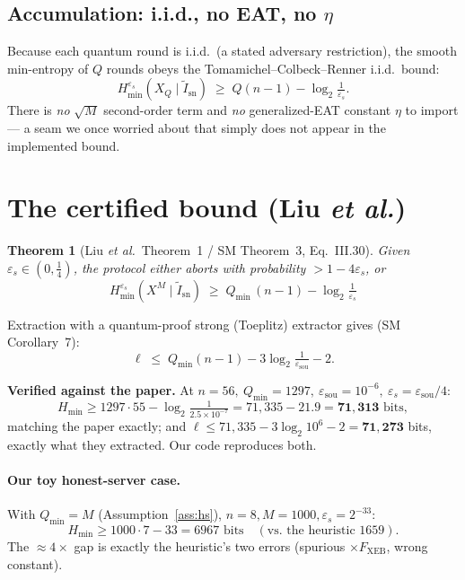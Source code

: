\documentclass[11pt]{article}
\theoremstyle{definition}
\theoremstyle{plain}
\newtheorem{theorem}{Theorem}
\newcommand{\Fxeb}{F_{\mathrm{XEB}}}
\newcommand{\Hmin}{H_{\min}}
\newcommand{\epss}{\varepsilon_{s}}
\newcommand{\epssou}{\varepsilon_{\mathrm{sou}}}
\newcommand{\Qmin}{Q_{\min}}
\begin{document}
\subsection{Accumulation: i.i.d., no EAT, no $\eta$}
Because each quantum round is i.i.d.\ (a stated adversary restriction), the smooth
min-entropy of $Q$ rounds obeys the Tomamichel--Colbeck--Renner i.i.d.\ bound:
\[
\Hmin^{\epss}(X_Q\mid \tilde I_{\mathrm{sn}}) \;\ge\; Q(n-1)-\log_2\tfrac1{\epss}.
\]
There is \emph{no} $\sqrt{M}$ second-order term and \emph{no} generalized-EAT constant
$\eta$ to import --- a seam we once worried about that simply does not appear in the
implemented bound.

\section{The certified bound (Liu \emph{et al.})}
\begin{theorem}[Liu \emph{et al.}\ Theorem~1 / SM Theorem~3, Eq.~III.30]\label{thm:main}
Given $\epss\in(0,\tfrac14)$, the protocol either aborts with probability $>1-4\epss$, or
\[
\boxed{\;\Hmin^{\epss}(X^M\mid\tilde I_{\mathrm{sn}}) \;\ge\; \Qmin\,(n-1)-\log_2\tfrac1{\epss}\;}
\]
\end{theorem}
Extraction with a quantum-proof strong (Toeplitz) extractor gives (SM Corollary~7):
\[
\ell \;\le\; \Qmin(n-1) - 3\log_2\tfrac1{\epssou} - 2 .
\]

\begin{okbox}
\textbf{Verified against the paper.} At $n=56,\ \Qmin=1297,\ \epssou=10^{-6},\ \epss=\epssou/4$:
\[
\Hmin\ge 1297\cdot55-\log_2\tfrac1{2.5\times10^{-7}} = 71{,}335-21.9 = \mathbf{71{,}313}\text{ bits},
\]
matching the paper exactly; and $\ell\le 71{,}335-3\log_2 10^6-2=\mathbf{71{,}273}$ bits,
exactly what they extracted. Our code reproduces both.
\end{okbox}

\paragraph{Our toy honest-server case.} With $\Qmin=M$ (Assumption~\ref{ass:hs}),
$n=8,M=1000,\epss=2^{-33}$:
\[
\Hmin\ge 1000\cdot7-33 = 6967\text{ bits}\quad(\text{vs.\ the heuristic }1659).
\]
The $\approx4\times$ gap is exactly the heuristic's two errors (spurious $\times\Fxeb$, wrong
constant).
\end{document}
